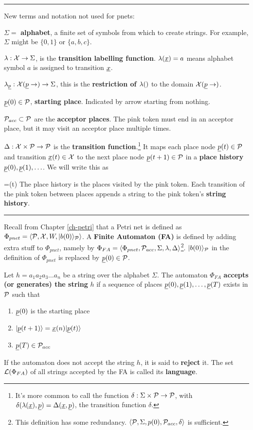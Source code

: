 \hrule
New terms and notation not used for pnets:

$\Sigma=$ {\bf alphabet}, a finite set of symbols
from which to create strings. For example,
$\Sigma$ might be $\{0, 1\}$ or $\{a, b, c\}$.

$\lambda:{\cal X}\rightarrow\Sigma$, is the {\bf transition labelling function}. $\lam(\rvx)=a$ means alphabet symbol $a$ is assigned to transition $\rvx$.  


$\lam_\rvp:\calx(\rvp\rarrow)\rarrow\Sigma$, this is the {\bf restriction of $\lambda()$}
to the domain $\calx(\rvp\rarrow)$.


$\rvp(0)\in \calp$, {\bf starting place}. Indicated by arrow starting from nothing.



${\cal P}_{acc}\subset {\cal P}$ are the 
{\bf acceptor places}. The pink token must end in an acceptor place, but it may visit
an acceptor place multiple times.


$\Delta:{\cal X}\times{\cal P}\rightarrow {\cal P}$ is the 
{\bf transition function}.\footnote{It's more common to call the function $\delta:\Sigma\times{\cal P}\rightarrow {\cal P}$, with $\delta(\lam(\rvx), \rvp)=\Delta(\rvx, \rvp)$, 
the
transition function $\delta$.}
It maps each place node $\rvp(t)\in\calp$ and transition $\rvx(t)\in\calx$ to the next place node $\rvp(t+1)\in\calp$ in a {\bf place history} $\rvp(0), \rvp(1), \ldots$. We will write this as

\beq
{}=\rvx(t)
\eeq
The place history is the places visited by the pink token. Each transition of
the pink token  between places appends a string
to the pink token's {\bf string history}.




\hrule
Recall from Chapter \ref{ch-petri} that a Petri net is defined as $\Phi_{pnet} = \left\langle{\cal P}, {\cal X}, W,|b(0)\rangle_{\cal P}\right\rangle$.
A {\bf Finite Automaton (FA)}
is defined by adding extra stuff to
$\Phi_{pnet}$, namely by
$\Phi_{FA}=\left\langle\Phi_{pnet},{\cal P}_{acc}, \Sigma, \lambda, \Delta\right\rangle$\footnote{This definition has some redundancy.  
$\left\langle{\cal P}, \Sigma, p(0), {\cal P}_{acc}, \delta\right\rangle$
is sufficient.}.
$|b(0)\rangle_{\cal P}$ in the definition
of $\Phi_{pnet}$ is replaced by
$\rvp(0)\in\calp$.

Let $h=a_1a_2a_3\ldots a_n$ be a string
over the alphabet $\Sigma$.
The automaton $\Phi_{FA}$ {\bf accepts (or generates) the string} $h$
if a sequence of places $\rvp(0), \rvp(1), \ldots, \rvp(T)$ exists
in ${\cal P}$ such that 
\begin{enumerate}
\item $\rvp(0)$  is the starting place
\item $\ket{\rvp(t+1) }= \rvx(n)\ket{\rvp(t)}$
\item $\rvp(T)\in \calp_{acc}$
\end{enumerate}
If the automaton does not accept the string $h$,
it is said to {\bf reject} it. The set ${\cal L}(\Phi_{FA})$ of all strings 
accepted by the FA is called its {\bf language}.

